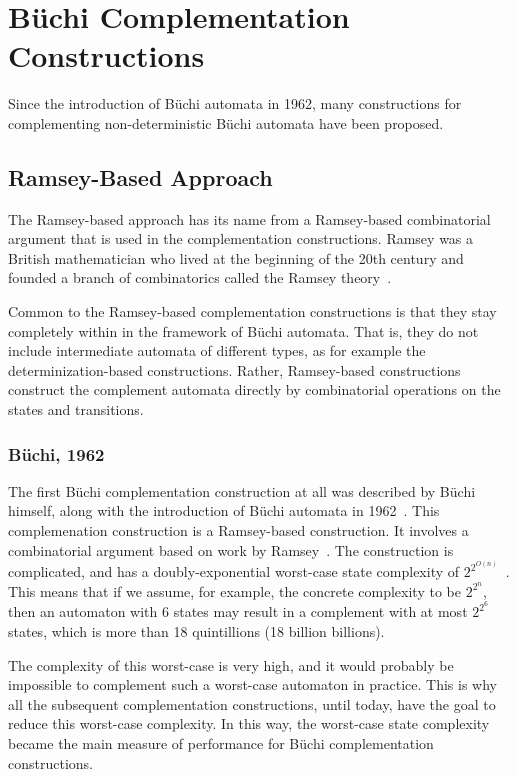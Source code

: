 \section{Büchi Complementation Constructions}
\label{2_review}
Since the introduction of Büchi automata in 1962, many constructions for complementing non-deterministic Büchi automata have been proposed. 



\subsection{Ramsey-Based Approach}
\label{2_ramsey-based}
The Ramsey-based approach has its name from a Ramsey-based combinatorial argument that is used in the complementation constructions. Ramsey was a British mathematician who lived at the beginning of the 20th century and founded a branch of combinatorics called the Ramsey theory~\cite{graham1990ramsey}.

Common to the  Ramsey-based complementation constructions is that they stay completely within in the framework of Büchi automata. That is, they do not include intermediate automata of different types, as for example the determinization-based constructions. Rather, Ramsey-based constructions construct the complement automata directly by combinatorial operations on the states and transitions.

\subsubsection{Büchi, 1962}

The first Büchi complementation construction at all was described by Büchi himself, along with the introduction of Büchi automata in 1962~\cite{buchi1960decision}. This complemenation construction is a Ramsey-based construction. It involves a combinatorial argument based on work by Ramsey~\cite{1930ramsey}. The construction is complicated, and has a doubly-exponential worst-case state complexity of $2^{2^{O\left(n\right)}}$~\cite{vardi2005buchi}. This means that if we assume, for example, the concrete complexity to be $2^{2^n}$, then an automaton with 6 states may result in a complement with at most $2^{2^6}$ states, which is more than 18 quintillions (18 billion billions).

The complexity of this worst-case is very high, and it would probably be impossible to complement such a worst-case automaton in practice. This is why all the subsequent complementation constructions, until today, have the goal to reduce this worst-case complexity. In this way, the worst-case state complexity became the main measure of performance for Büchi complementation constructions.

